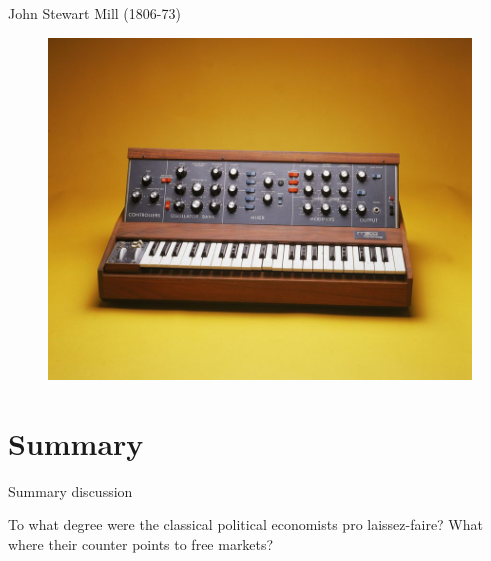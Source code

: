 \documentclass{beamer}
\begin{document}
\begin{frame}{John Stewart Mill (1806-73)}

\begin{figure}[htpb]
	\centering
	\includegraphics[width=0.8\linewidth]{../img/synth.jpg}
\end{figure}
	
\end{frame}

\section{Summary}

\begin{frame}{Summary discussion}

To what degree were the classical political economists pro laissez-faire? What
where their counter points to free markets?

\end{frame}
\end{document}

